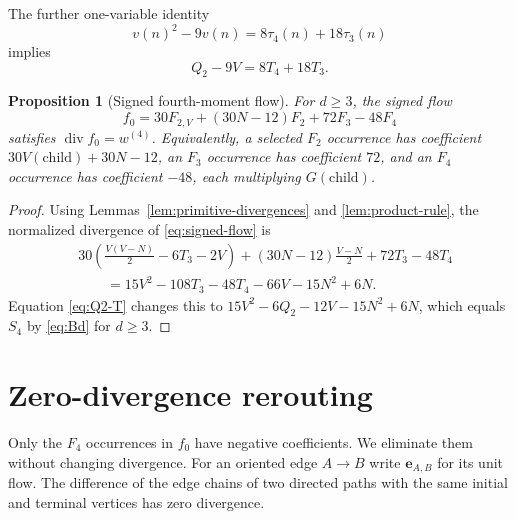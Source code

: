 \documentclass[11pt]{amsart}
\newtheorem{proposition}[theorem]{Proposition}
\theoremstyle{definition}
\theoremstyle{remark}
\newcommand{\divg}{\operatorname{div}}
\newcommand{\edge}[2]{\mathbf e_{#1,#2}}
\begin{document}
The further one-variable identity
\begin{equation}
 v(n)^2-9v(n)=8\tau_4(n)+18\tau_3(n)
 \label{eq:one-variable-k4}
\end{equation}
implies
\begin{equation}
 Q_2-9V=8T_4+18T_3.
 \label{eq:Q2-T}
\end{equation}

\begin{proposition}[Signed fourth-moment flow]
\label{prop:signed-flow}
For $d\ge3$, the signed flow
\begin{equation}
 f_0=30F_{2,V}+(30N-12)F_2+72F_3-48F_4
 \label{eq:signed-flow}
\end{equation}
satisfies $\divg f_0=w^{(4)}$.  Equivalently, a selected $F_2$
occurrence has coefficient $30V(\text{child})+30N-12$, an $F_3$
occurrence has coefficient $72$, and an $F_4$ occurrence has coefficient
$-48$, each multiplying $G(\text{child})$.
\end{proposition}

\begin{proof}
Using Lemmas~\ref{lem:primitive-divergences} and
\ref{lem:product-rule}, the normalized divergence of \eqref{eq:signed-flow}
is
\begin{align*}
 &30\left(\frac{V(V-N)}2-6T_3-2V\right)
 +(30N-12)\frac{V-N}{2}+72T_3-48T_4\\
 &\qquad=15V^2-108T_3-48T_4-66V-15N^2+6N.
\end{align*}
Equation \eqref{eq:Q2-T} changes this to
$15V^2-6Q_2-12V-15N^2+6N$, which equals $S_4$ by
\eqref{eq:Bd} for $d\ge3$.
\end{proof}

\section{Zero-divergence rerouting}
\label{sec:rerouting}

Only the $F_4$ occurrences in $f_0$ have negative coefficients.  We
eliminate them without changing divergence.  For an oriented edge $A\to B$
write $\edge AB$ for its unit flow.  The difference of the edge chains of
two directed paths with the same initial and terminal vertices has zero
divergence.
\end{document}
